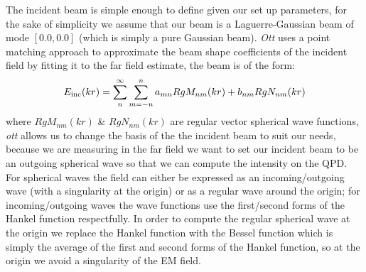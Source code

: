 The incident beam is simple enough to define given our set up parameters, for the sake of simplicity we assume that our beam is a Laguerre-Gaussian beam of mode $[0.0, 0.0]$ (which is simply a pure Gaussian beam). \textit{Ott} uses a point matching approach to approximate the beam shape coefficients of the incident field by fitting it to the far field estimate, the beam is of the form:
\begin{align}
	E_{\rm inc}(kr)=\sum^\infty_n\sum^n_{m=-n}a_{mn}RgM_{nm}(kr)+b_{nm}RgN_{nm}(kr)
\end{align}
where $RgM_{nm}(kr)$ \& $RgN_{nm}(kr)$ are regular vector spherical wave functions, \textit{ott} allows us to change the basis of the the incident beam to suit our needs, because we are measuring in the far field we want to set our incident beam to be an outgoing spherical wave so that we can compute the intensity on the QPD. For spherical waves the field can either be expressed as an incoming/outgoing wave (with a singularity at the origin) or as a regular wave around the origin; for incoming/outgoing waves the wave functions use the first/second forms of the Hankel function respectfully. In order to compute the regular spherical wave at the origin we replace the Hankel function with the Bessel function which is simply the average of the first and second forms of the Hankel function, so at the origin we avoid a singularity of the EM field.  

